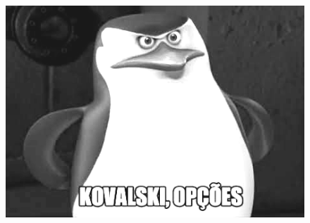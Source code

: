 \documentclass[a4paper,12pt,oneside,twocolumn]{Config/milktest}
\begin{document}

\bigskip


\centering\color{cor}{\scshape boa prova}


\bigskip 
\hrulefill
\begin{figure}[H]
\begin{center}
\includegraphics[scale=0.9]{Figuras/mem3.png}

\end{center} 
\end{figure}



% 

% 

% 

% 
\end{document}
